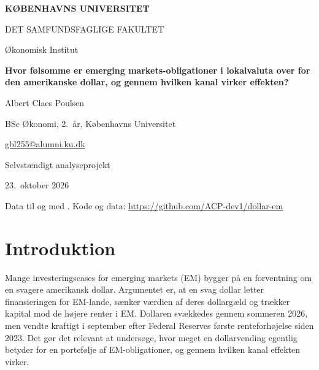 \documentclass[11pt,a4paper]{article}
\begin{document}
\renewcommand{\tablename}{Tabel}
\renewcommand{\figurename}{Figur}
\renewcommand{\refname}{Litteraturliste}
\renewcommand{\contentsname}{Indholdsfortegnelse}

\begin{titlepage}
\centering
\vspace*{1.5cm}
{\Large\bfseries KØBENHAVNS UNIVERSITET\par}
\vspace{0.2cm}
{\large DET SAMFUNDSFAGLIGE FAKULTET\par}
{\large Økonomisk Institut\par}
\vspace{3cm}
{\LARGE\bfseries Hvor følsomme er emerging markets-obligationer i lokalvaluta over for den amerikanske dollar, og gennem hvilken kanal virker effekten?\par}
\vspace{2.5cm}
{\large Albert Claes Poulsen\par}
\vspace{0.2cm}
{\normalsize BSc Økonomi, 2.\ år, Københavns Universitet\par}
{\normalsize \href{mailto:gbl255@alumni.ku.dk}{gbl255@alumni.ku.dk}\par}
\vspace{1.2cm}
{\normalsize Selvstændigt analyseprojekt\par}
{\normalsize 23.\ oktober 2026\par}
\vfill
{\small Data til og med \DataTil. Kode og data: \url{https://github.com/ACP-dev1/dollar-em}\par}
\end{titlepage}

\tableofcontents
\newpage

\section*{Introduktion}

Mange investeringscases for emerging markets (EM) bygger på en forventning om en svagere amerikansk dollar. Argumentet er, at en svag dollar letter finansieringen for EM-lande, sænker værdien af deres dollargæld og trækker kapital mod de højere renter i EM. Dollaren svækkedes gennem sommeren 2026, men vendte kraftigt i september efter Federal Reserves første renteforhøjelse siden 2023. Det gør det relevant at undersøge, hvor meget en dollarvending egentlig betyder for en portefølje af EM-obligationer, og gennem hvilken kanal effekten virker.
\end{document}
